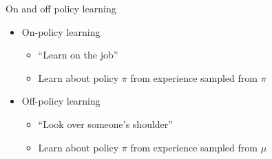 \bgroup
\begin{frame}{On and off policy learning}
\begin{itemize}
\item \textcolor{mImagelabRed}{On-policy learning} 
\begin{itemize}
\item ``Learn on the job''
\item Learn about policy $\pi$ from experience sampled from $\pi$
\end{itemize}
\item \textcolor{mImagelabRed}{Off-policy learning}
\begin{itemize}
\item ``Look over someone’s shoulder''
\item Learn about policy $\pi$ from experience sampled from $\mu$
\end{itemize}
\end{itemize}
\end{frame}
\egroup
